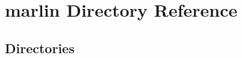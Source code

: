 \section{marlin Directory Reference}
\label{dir_4927317323d72baae70e00f92e7158c3}
\subsection*{Directories}
\begin{DoxyCompactItemize}
\end{DoxyCompactItemize}

